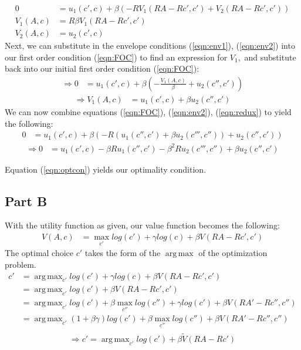 \documentclass[11pt]{article} %
\DeclareMathOperator*{\argmax}{arg\,max}
\begin{document}
\begin{align}
0&= u_1(c',c) + \beta (-RV_1(RA-Rc',c') + V_2(RA-Rc',c')) \label{eqn:FOC} \\
V_1(A,c) &= R\beta V_1(RA-Rc',c') \label{eqn:env1} \\
V_2(A,c) &= u_2(c',c) \label{eqn:env2}
\end{align}
Next, we can substitute in the envelope conditions (\ref{eqn:env1}), (\ref{eqn:env2}) into our first order condition (\ref{eqn:FOC}) to find an expression for $V_1,$ and substitute back into our initial first order condition (\ref{eqn:FOC}):
\begin{align*}
\Rightarrow 0 &= u_1(c',c) + \beta \left( -\frac{V_1(A,c)}{\beta} + u_2(c'',c')\right)
\end{align*}
\begin{align}
\Rightarrow V_1(A,c) &= u_1(c',c) + \beta u_2(c'',c') \label{eqn:redux}
\end{align}
We can now combine equations (\ref{eqn:FOC}), (\ref{eqn:env2}), (\ref{eqn:redux}) to yield the following:
\begin{align*}
 0&= u_1(c',c) + \beta(-R(u_1(c'',c') + \beta u_2(c''',c'')) + u_2(c'',c'))
\end{align*}
\begin{align}
\Rightarrow 0&= u_1(c',c) - \beta R u_1(c'',c') - \beta^2 R u_2(c''',c'') + \beta u_2(c'',c') \label{eqn:optcon}
\end{align}

Equation (\ref{eqn:optcon}) yields our optimality condition.

\subsection{Part B}
With the utility function as given, our value function becomes the following:
\begin{align*}
V(A,c) &= \max_{c'} log(c') + \gamma log(c) + \beta V(RA-Rc',c')
\end{align*}
The optimal choice $c'$ takes the form of the $\argmax$ of the optimization problem. 
\begin{align*}
c' &= \argmax_{c'}  log(c') + \gamma log(c) + \beta V(RA-Rc',c')\\
&= \argmax_{c'}  log(c') + \beta V(RA-Rc',c')\\
&=  \argmax_{c'}  log(c') + \beta \max_{c''} log(c'') + \gamma log(c')  + \beta V(RA'-Rc'',c'') \\
&= \argmax_{c'}  (1+\beta \gamma) log(c') + \beta \max_{c''} log(c'')   + \beta V(RA'-Rc'',c'') \\
\end{align*}
\begin{equation}
\Rightarrow c' = \argmax_{c'}   log(c') + \beta \tilde{V}(RA-Rc') \label{eqn:vtilde}
\end{equation}
\end{document}
